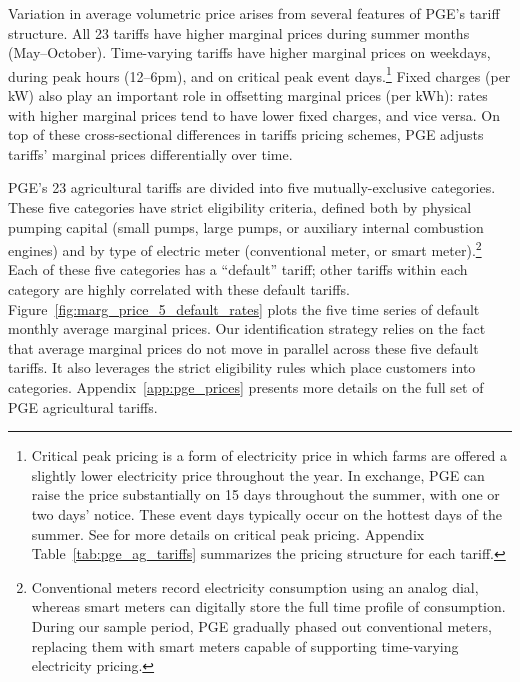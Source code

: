 Variation in average volumetric price arises from several features of PGE's tariff structure. All 23 tariffs have higher marginal prices during summer months (May--October). Time-varying tariffs have higher marginal prices on weekdays, during peak hours (12--6pm), and on critical peak event days.\footnote{Critical peak pricing is a form of electricity price in which farms are offered a slightly lower electricity price throughout the year. In exchange, PGE can raise the price substantially on 15 days throughout the summer, with one or two days' notice. These event days typically occur on the hottest days of the summer. See \textcite{blonz2016} for more details on critical peak pricing. Appendix Table~\ref{tab:pge_ag_tariffs} summarizes the pricing structure for each tariff.} Fixed charges (per kW) also play an important role in offsetting marginal prices (per kWh): rates with higher marginal prices tend to have lower fixed charges, and vice versa. On top of these cross-sectional differences in tariffs pricing schemes, PGE adjusts tariffs' marginal prices differentially over time. 

PGE's 23 agricultural tariffs are divided into five mutually-exclusive categories. These five categories have strict eligibility criteria, defined both by physical pumping capital (small pumps, large pumps, or auxiliary internal combustion engines) and by type of electric meter (conventional meter, or smart meter).\footnote{Conventional meters record electricity consumption using an analog dial, whereas smart meters can digitally store the full time profile of consumption. During our sample period, PGE gradually phased out conventional meters, replacing them with smart meters capable of supporting time-varying electricity pricing.} Each of these five categories has a ``default'' tariff; other tariffs within each category are highly correlated with these default tariffs. Figure~\ref{fig:marg_price_5_default_rates} plots the five time series of default monthly average marginal prices. Our identification strategy relies on the fact that average marginal prices do not move in parallel across these five default tariffs. It also leverages the strict eligibility rules which place customers into categories. Appendix~\ref{app:pge_prices} presents more details on the full set of PGE agricultural tariffs.


 
